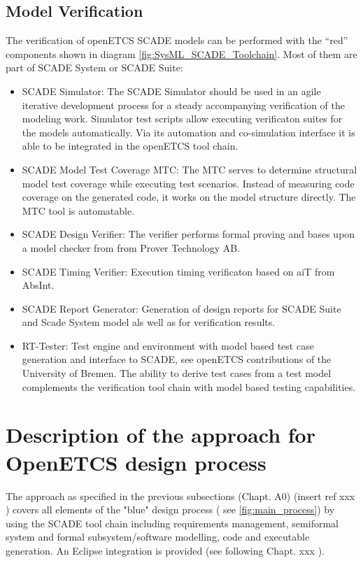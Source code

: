 \subsection{Model Verification}
\label{sec:SysML_SCADE_ModelVerification}

The verification of openETCS SCADE models can be performed with the "`red"' components shown in diagram \ref{fig:SysML_SCADE_Toolchain}. Most of them are part of SCADE System or SCADE Suite:

\begin{itemize}
	\item SCADE Simulator: The SCADE Simulator should be used in an agile iterative development process for a steady accompanying verification of the modeling work. Simulator test scripts allow executing verificaton suites for the models automatically. Via its automation and co-simulation interface it is able to be integrated in the openETCS tool chain. 
	\item  SCADE Model Test Coverage MTC: The MTC serves to determine structural model test coverage while executing test scenarios. Instead of measuring code coverage on the generated code, it works on the model structure directly. The MTC tool is automatable. 
	\item SCADE Design Verifier: The verifier performs formal proving and bases upon a model checker from from Prover Technology AB.  
	\item SCADE Timing Verifier: Execution timing verificaton based on aiT from AbsInt.
	\item SCADE Report Generator: Generation of design reports for SCADE Suite and Scade System model als well as for verification results. 
	\item RT-Tester: Test engine and environment with model based test case generation and interface to SCADE, see openETCS contributions of the University of Bremen. The ability to derive test cases from a test model complements the verification tool chain with model based testing capabilities.  
\end{itemize}
  

\section{Description of the approach for OpenETCS design process}

The approach as specified in the previous subsections (Chapt. A0) (insert ref xxx ) covers all elements of the "blue" design process ( see \ref{fig:main_process}) 
by using the SCADE tool chain including requirements management, semiformal system and formal subsystem/software modelling, code and executable generation. 
An Eclipse integration is provided (see following Chapt. xxx ). 

